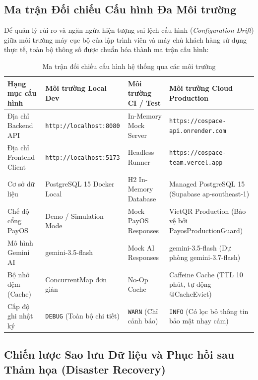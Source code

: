 \subsection{Ma trận Đối chiếu Cấu hình Đa Môi trường}

Để quản lý rủi ro và ngăn ngừa hiện tượng sai lệch cấu hình (\textit{Configuration Drift}) giữa môi trường máy cục bộ của lập trình viên và máy chủ khách hàng sử dụng thực tế, toàn bộ thông số được chuẩn hóa thành ma trận cấu hình:

\begin{table}[H]
\centering
\caption{Ma trận đối chiếu cấu hình hệ thống qua các môi trường}
\label{tab:environment-matrix}
\renewcommand{\arraystretch}{1.3}
\begin{tabular}{|p{3.5cm}|p{3.5cm}|p{3.5cm}|p{4cm}|}
\hline
\textbf{Hạng mục cấu hình} & \textbf{Môi trường Local Dev} & \textbf{Môi trường CI / Test} & \textbf{Môi trường Cloud Production} \\
\hline
Địa chỉ Backend API & \texttt{http://localhost:8080} & In-Memory Mock Server & \texttt{https://cospace-api.onrender.com} \\
\hline
Địa chỉ Frontend Client & \texttt{http://localhost:5173} & Headless Runner & \texttt{https://cospace-team.vercel.app} \\
\hline
Cơ sở dữ liệu & PostgreSQL 15 Docker Local & H2 In-Memory Database & Managed PostgreSQL 15 (Supabase ap-southeast-1) \\
\hline
Chế độ cổng PayOS & Demo / Simulation Mode & Mock PayOS Responses & VietQR Production (Bảo vệ bởi PayosProductionGuard) \\
\hline
Mô hình Gemini AI & gemini-3.5-flash & Mock AI Responses & gemini-3.5-flash (Dự phòng gemini-3.7-flash) \\
\hline
Bộ nhớ đệm (Cache) & ConcurrentMap đơn giản & No-Op Cache & Caffeine Cache (TTL 10 phút, tự động @CacheEvict) \\
\hline
Cấp độ ghi nhật ký & \texttt{DEBUG} (Toàn bộ chi tiết) & \texttt{WARN} (Chỉ cảnh báo) & \texttt{INFO} (Có lọc bỏ thông tin bảo mật nhạy cảm) \\
\hline
\end{tabular}
\end{table}

\subsection{Chiến lược Sao lưu Dữ liệu và Phục hồi sau Thảm họa (Disaster Recovery)}

